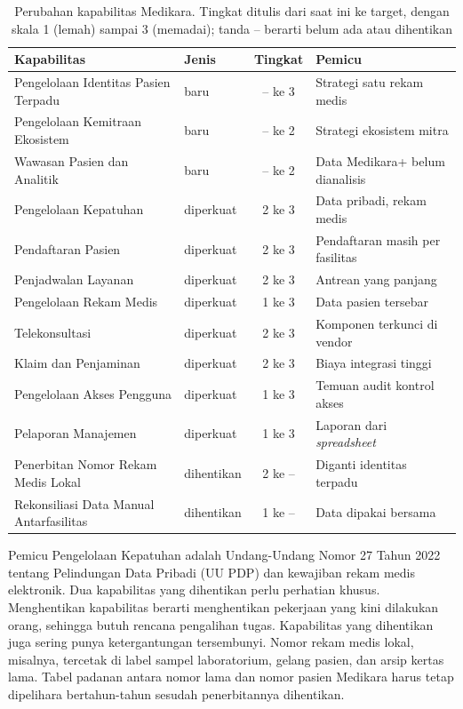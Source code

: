 \begin{table}[!htb]
  \centering
  \caption{Perubahan kapabilitas Medikara. Tingkat ditulis dari saat ini ke target, dengan
           skala 1 (lemah) sampai 3 (memadai); tanda -- berarti belum ada atau dihentikan}
  \label{tab:ch08-perubahan-kapabilitas}
  \begin{tabularx}{\textwidth}{>{\raggedright\arraybackslash}p{4.6cm}lc>{\raggedright\arraybackslash}X}
    \hline
    \textbf{Kapabilitas} & \textbf{Jenis} & \textbf{Tingkat} & \textbf{Pemicu} \\
    \hline
    Pengelolaan Identitas Pasien Terpadu & baru & -- ke 3 & Strategi satu rekam medis \\
    \hline
    Pengelolaan Kemitraan Ekosistem & baru & -- ke 2 & Strategi ekosistem mitra \\
    \hline
    Wawasan Pasien dan Analitik & baru & -- ke 2 & Data Medikara+ belum dianalisis \\
    \hline
    Pengelolaan Kepatuhan & diperkuat & 2 ke 3 & Data pribadi, rekam medis \\
    \hline
    Pendaftaran Pasien & diperkuat & 2 ke 3 & Pendaftaran masih per fasilitas \\
    \hline
    Penjadwalan Layanan & diperkuat & 2 ke 3 & Antrean yang panjang \\
    \hline
    Pengelolaan Rekam Medis & diperkuat & 1 ke 3 & Data pasien tersebar \\
    \hline
    Telekonsultasi & diperkuat & 2 ke 3 & Komponen terkunci di vendor \\
    \hline
    Klaim dan Penjaminan & diperkuat & 2 ke 3 & Biaya integrasi tinggi \\
    \hline
    Pengelolaan Akses Pengguna & diperkuat & 1 ke 3 & Temuan audit kontrol akses \\
    \hline
    Pelaporan Manajemen & diperkuat & 1 ke 3 & Laporan dari \textit{spreadsheet} \\
    \hline
    Penerbitan Nomor Rekam Medis Lokal & dihentikan & 2 ke -- & Diganti identitas terpadu \\
    \hline
    Rekonsiliasi Data Manual Antarfasilitas & dihentikan & 1 ke -- & Data dipakai bersama \\
    \hline
  \end{tabularx}
\end{table}

Pemicu Pengelolaan Kepatuhan adalah Undang-Undang Nomor 27 Tahun 2022 tentang Pelindungan
Data Pribadi (UU PDP) \cite{uu27-2022-pdp} dan kewajiban rekam medis elektronik. Dua
kapabilitas yang dihentikan perlu perhatian khusus.
Menghentikan kapabilitas berarti menghentikan pekerjaan yang kini dilakukan orang, sehingga
butuh rencana pengalihan tugas. Kapabilitas yang dihentikan juga sering punya ketergantungan
tersembunyi. Nomor rekam medis lokal, misalnya, tercetak di label sampel laboratorium,
gelang pasien, dan arsip kertas lama. Tabel padanan antara nomor lama dan nomor pasien
Medikara harus tetap dipelihara bertahun-tahun sesudah penerbitannya dihentikan.

